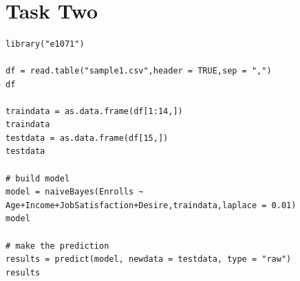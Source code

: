 \documentclass{article}
\begin{document}
\begin{figure}[H]
    \\
\end{figure}


\section{Task Two}
\begin{lstlisting}
library("e1071")

df = read.table("sample1.csv",header = TRUE,sep = ",")
df

traindata = as.data.frame(df[1:14,])
traindata
testdata = as.data.frame(df[15,])
testdata

# build model
model = naiveBayes(Enrolls ~ Age+Income+JobSatisfaction+Desire,traindata,laplace = 0.01)
model

# make the prediction
results = predict(model, newdata = testdata, type = "raw")
results

\end{lstlisting}
\end{document}
